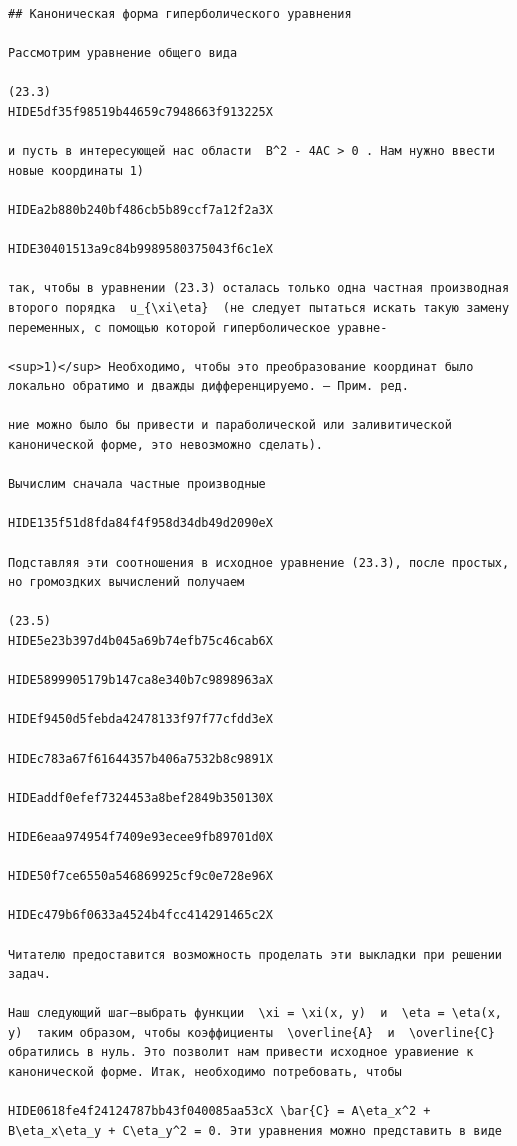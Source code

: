 \documentclass[
  ukrainian,
]{article}
\begin{document}
\begin{verbatim}
## Каноническая форма гиперболического уравнения

Рассмотрим уравнение общего вида

(23.3) 
HIDE5df35f98519b44659c7948663f913225X

и пусть в интересующей нас области  B^2 - 4AC > 0 . Нам нужно ввести новые координаты 1)

HIDEa2b880b240bf486cb5b89ccf7a12f2a3X

HIDE30401513a9c84b9989580375043f6c1eX

так, чтобы в уравнении (23.3) осталась только одна частная производная второго порядка  u_{\xi\eta}  (не следует пытаться искать такую замену переменных, с помощью которой гиперболическое уравне-

<sup>1)</sup> Необходимо, чтобы это преобразование координат было локально обратимо и дважды дифференцируемо. — Прим. ред.

ние можно было бы привести и параболической или заливитической канонической форме, это невозможно сделать).

Вычислим сначала частные производные

HIDE135f51d8fda84f4f958d34db49d2090eX

Подставляя эти соотношения в исходное уравнение (23.3), после простых, но громоздких вычислений получаем

(23.5) 
HIDE5e23b397d4b045a69b74efb75c46cab6X

HIDE5899905179b147ca8e340b7c9898963aX

HIDEf9450d5febda42478133f97f77cfdd3eX

HIDEc783a67f61644357b406a7532b8c9891X

HIDEaddf0efef7324453a8bef2849b350130X

HIDE6eaa974954f7409e93ecee9fb89701d0X

HIDE50f7ce6550a546869925cf9c0e728e96X

HIDEc479b6f0633a4524b4fcc414291465c2X

Читателю предоставится возможность проделать эти выкладки при решении задач.

Наш следующий шаг—выбрать функции  \xi = \xi(x, y)  и  \eta = \eta(x, y)  таким образом, чтобы коэффициенты  \overline{A}  и  \overline{C}  обратились в нуль. Это позволит нам привести исходное уравиение к канонической форме. Итак, необходимо потребовать, чтобы

HIDE0618fe4f24124787bb43f040085aa53cX \bar{C} = A\eta_x^2 + B\eta_x\eta_y + C\eta_y^2 = 0. Эти уравнения можно представить в виде


\end{verbatim}
\end{document}
